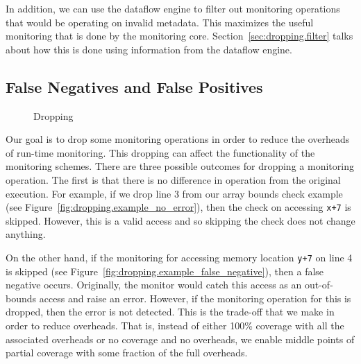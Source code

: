 In addition, we can use the dataflow engine to filter out monitoring operations
that would be operating on invalid metadata. This maximizes the useful
monitoring that is done by the monitoring core.
Section~\ref{sec:dropping.filter} talks about how this is done using
information from the dataflow engine.

\subsection{False Negatives and False Positives}
\label{sec:dropping.false_neg_pos}

\begin{figure*}
  \begin{center}
  \hspace{0.2in}
  \hspace{0.2in}
  \caption{Dropping}
  \label{fig:dropping.example_dropping}
  \end{center}
\end{figure*}

Our goal is to drop some monitoring operations in order to reduce the overheads
of run-time monitoring. This dropping can affect the functionality of the
monitoring schemes. There are three possible outcomes for dropping a
monitoring operation. The first is that there is no difference in operation
from the original execution. For example, if we drop line 3 from our array
bounds check example (see Figure~\ref{fig:dropping.example_no_error}), then the
check on accessing {\tt x+7} is skipped. However, this is a valid access and so
skipping the check does not change anything.

On the other hand, if the monitoring for accessing memory location {\tt y+7} on
line 4 is skipped (see Figure~\ref{fig:dropping.example_false_negative}), then
a false negative occurs. Originally, the monitor would catch this access as an
out-of-bounds access and raise an error. However, if the monitoring operation
for this is dropped, then the error is not detected. This is the trade-off that
we make in order to reduce overheads. That is, instead of either 100\% coverage
with all the associated overheads or no coverage and no overheads, we 
enable middle points of partial coverage with some fraction of the full
overheads.

